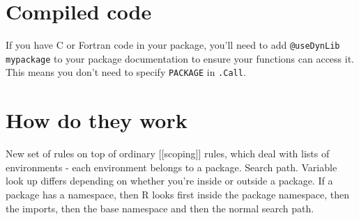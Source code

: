 \section{Compiled code}

If you have C or Fortran code in your package, you'll need to add
\texttt{@useDynLib mypackage} to your package documentation to ensure
your functions can access it. This means you don't need to specify
\texttt{PACKAGE} in \texttt{.Call}.

\section{How do they work}

New set of rules on top of ordinary {[}{[}scoping{]}{]} rules, which
deal with lists of environments - each environment belongs to a package.
Search path. Variable look up differs depending on whether you're inside
or outside a package. If a package has a namespace, then R looks first
inside the package namespace, then the imports, then the base namespace
and then the normal search path.
